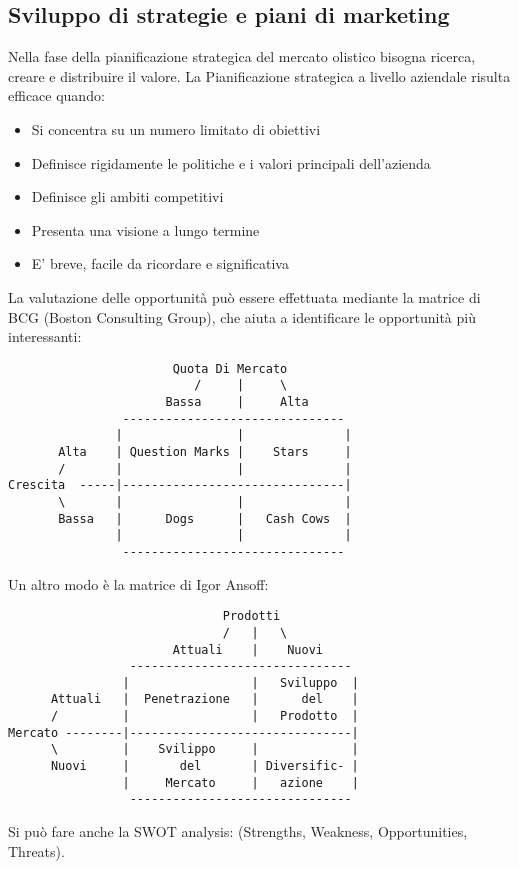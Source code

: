 \documentclass[11pt]{article}
\begin{document}
\subsection{Sviluppo di strategie e piani di marketing}
Nella fase della pianificazione strategica del mercato olistico bisogna ricerca, creare e distribuire il valore. 
La Pianificazione strategica a livello aziendale risulta efficace quando:
\begin{itemize}[noitemsep,topsep=0ex]
	\item Si concentra su un numero limitato di obiettivi
	\item Definisce rigidamente le politiche e i valori principali dell'azienda
	\item Definisce gli ambiti competitivi
	\item Presenta una visione a lungo termine
	\item E' breve, facile da ricordare e significativa
\end{itemize}
\pagebreak
La valutazione delle opportunità può essere effettuata mediante la matrice di BCG (Boston Consulting Group), che aiuta a identificare le opportunità più interessanti:
\begin{verbatim}
                       Quota Di Mercato
                          /     |     \
                      Bassa     |     Alta
                -------------------------------     
               |                |              |
       Alta    | Question Marks |    Stars     |
       /       |                |              |
Crescita  -----|-------------------------------|
       \       |                |              |
       Bassa   |      Dogs      |   Cash Cows  |
               |                |              |
                -------------------------------
\end{verbatim}
Un altro modo è la matrice di Igor Ansoff:
\begin{verbatim}
                              Prodotti
                              /   |   \
                       Attuali    |    Nuovi
                 -------------------------------     
                |                 |   Sviluppo  |
      Attuali   |  Penetrazione   |      del    |
      /         |                 |   Prodotto  |
Mercato --------|-------------------------------|
      \         |    Svilippo     |             |
      Nuovi     |       del       | Diversific- |  
                |     Mercato     |   azione    |
                 -------------------------------
\end{verbatim}
Si può fare anche la SWOT analysis: (Strengths, Weakness, Opportunities, Threats).\newline
\end{document}
